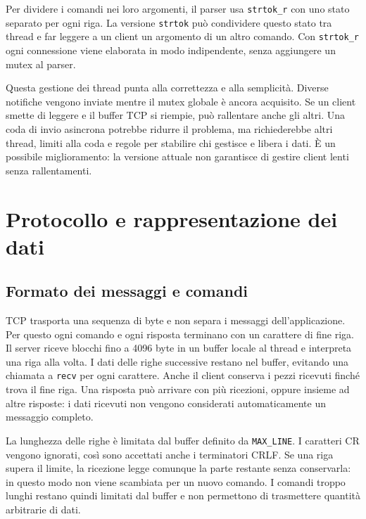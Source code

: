 \documentclass[11pt,a4paper]{article}
\begin{document}
Per dividere i comandi nei loro argomenti, il parser usa \texttt{strtok\_r} con uno stato separato per ogni riga. La versione \texttt{strtok} può condividere questo stato tra thread e far leggere a un client un argomento di un altro comando. Con \texttt{strtok\_r} ogni connessione viene elaborata in modo indipendente, senza aggiungere un mutex al parser.

Questa gestione dei thread punta alla correttezza e alla semplicità. Diverse notifiche vengono inviate mentre il mutex globale è ancora acquisito. Se un client smette di leggere e il buffer TCP si riempie, può rallentare anche gli altri. Una coda di invio asincrona potrebbe ridurre il problema, ma richiederebbe altri thread, limiti alla coda e regole per stabilire chi gestisce e libera i dati. È un possibile miglioramento: la versione attuale non garantisce di gestire client lenti senza rallentamenti.

\clearpage

\section{Protocollo e rappresentazione dei dati}

\subsection{Formato dei messaggi e comandi}

TCP trasporta una sequenza di byte e non separa i messaggi dell'applicazione. Per questo ogni comando e ogni risposta terminano con un carattere di fine riga. Il server riceve blocchi fino a 4096 byte in un buffer locale al thread e interpreta una riga alla volta. I dati delle righe successive restano nel buffer, evitando una chiamata a \texttt{recv} per ogni carattere. Anche il client conserva i pezzi ricevuti finché trova il fine riga. Una risposta può arrivare con più ricezioni, oppure insieme ad altre risposte: i dati ricevuti non vengono considerati automaticamente un messaggio completo.

La lunghezza delle righe è limitata dal buffer definito da \texttt{MAX\_LINE}. I caratteri CR vengono ignorati, così sono accettati anche i terminatori CRLF. Se una riga supera il limite, la ricezione legge comunque la parte restante senza conservarla: in questo modo non viene scambiata per un nuovo comando. I comandi troppo lunghi restano quindi limitati dal buffer e non permettono di trasmettere quantità arbitrarie di dati.
\end{document}
